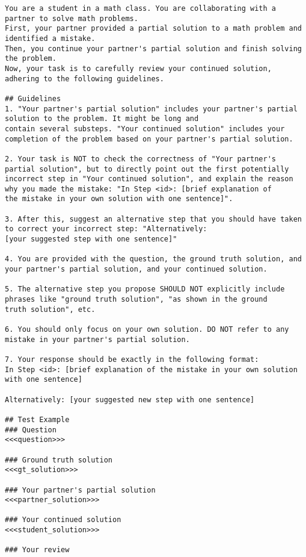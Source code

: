 \begin{tcolorbox}[blue_box, title = {{Prompt Template 2.2.2 --- Critic corrects mistakes for a second round}}]\tiny
\begin{verbatim}
You are a student in a math class. You are collaborating with a partner to solve math problems. 
First, your partner provided a partial solution to a math problem and identified a mistake. 
Then, you continue your partner's partial solution and finish solving the problem. 
Now, your task is to carefully review your continued solution, adhering to the following guidelines.

## Guidelines
1. "Your partner's partial solution" includes your partner's partial solution to the problem. It might be long and 
contain several substeps. "Your continued solution" includes your completion of the problem based on your partner's partial solution.

2. Your task is NOT to check the correctness of "Your partner's partial solution", but to directly point out the first potentially
incorrect step in "Your continued solution", and explain the reason why you made the mistake: "In Step <id>: [brief explanation of 
the mistake in your own solution with one sentence]".

3. After this, suggest an alternative step that you should have taken to correct your incorrect step: "Alternatively: 
[your suggested step with one sentence]"

4. You are provided with the question, the ground truth solution, and your partner's partial solution, and your continued solution.

5. The alternative step you propose SHOULD NOT explicitly include phrases like "ground truth solution", "as shown in the ground 
truth solution", etc.

6. You should only focus on your own solution. DO NOT refer to any mistake in your partner's partial solution.

7. Your response should be exactly in the following format:
In Step <id>: [brief explanation of the mistake in your own solution with one sentence]

Alternatively: [your suggested new step with one sentence]

## Test Example
### Question
<<<question>>>

### Ground truth solution
<<<gt_solution>>>

### Your partner's partial solution
<<<partner_solution>>>

### Your continued solution
<<<student_solution>>>

### Your review

\end{verbatim}
\end{tcolorbox}